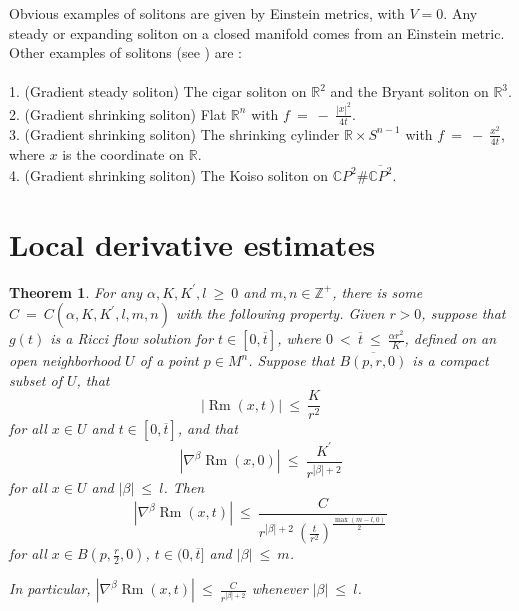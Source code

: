\documentclass[12pt]{amsart}
\newcommand{\C}{{\mathbb C}}
\newcommand{\R}{{\mathbb R}}
\newcommand{\Rm}{\operatorname{Rm}}
\newcommand{\Z}{{\mathbb Z}}
\numberwithin{equation}{section}
\theoremstyle{plain}
\newtheorem{theorem}[equation]{Theorem}
\theoremstyle{definition}
\theoremstyle{remark}
\begin{document}
Obvious examples of solitons are given by Einstein metrics, with 
$V = 0$. Any steady or expanding soliton on a closed
manifold comes from an Einstein metric.  Other examples of solitons
(see \cite[Chapter 2]{Chow-Knopf})
are : \\ \\
1. (Gradient steady soliton) The cigar soliton on $\R^2$ and the Bryant soliton
on $\R^3$. \\
2. (Gradient shrinking soliton) Flat $\R^n$ with $f \: = \: - \:
\frac{|x|^2}{4t}$. \\
3. (Gradient shrinking soliton) The shrinking cylinder 
$\R \times S^{n-1}$ with 
$f \: = \: - \: \frac{x^2}{4t}$, where $x$ is the coordinate on $\R$. \\
4. (Gradient shrinking soliton) The Koiso soliton on $\C P^2 \#
\overline{\C P^2}$.

\section{Local derivative estimates} \label{applocalder}

\begin{theorem} \label{localder}
For any $\alpha, K, K^\prime, l \: \ge \: 0$ and $m, n \in \Z^+$,
there is some $C \: = \: C(\alpha, K, K^\prime, l,m, n)$ with the
following property. 
Given $r > 0$, 
suppose that $g(t)$ is a Ricci flow solution 
for $t \in [0, \overline{t}]$, where $0 \: < \: 
\overline{t} \: \le \:
\frac{\alpha r^2}{K}$, defined on an open neighborhood $U$ of a point
$p \in M^n$. Suppose that $\overline{B(p, r, 0)}$ is a compact
subset of $U$, that
\begin{equation}
|\Rm(x, t)| \: \le \: \frac{K}{r^{2}}
\end{equation}
for all $x \in U$ and $t \in [0, \overline{t}]$, and that
\begin{equation}
|\nabla^\beta \Rm(x, 0)| \: \le \: \frac{K^\prime}{r^{|\beta|+2}}
\end{equation}
for all $x \in U$ and $|\beta| \: \le \: l$.
Then
\begin{equation}
|\nabla^\beta \Rm(x, t)| \: \le \: 
\frac{C}{
r^{|\beta|+2} \: \left( \frac{t}{r^2} \right)^{\frac{\max(m-l,0)}{2}}
}
\end{equation}
for all $x \in B \left(p, \frac{r}{2}, 0 \right)$,
$t \in (0, \overline{t}]$ and $|\beta| \: \le \: m$. 

In particular, 
$|\nabla^\beta \Rm(x, t)| \: \le \: 
\frac{C}{r^{|\beta|+2}}$ whenever 
$|\beta| \: \le \: l$.
\end{theorem}
\end{document}
